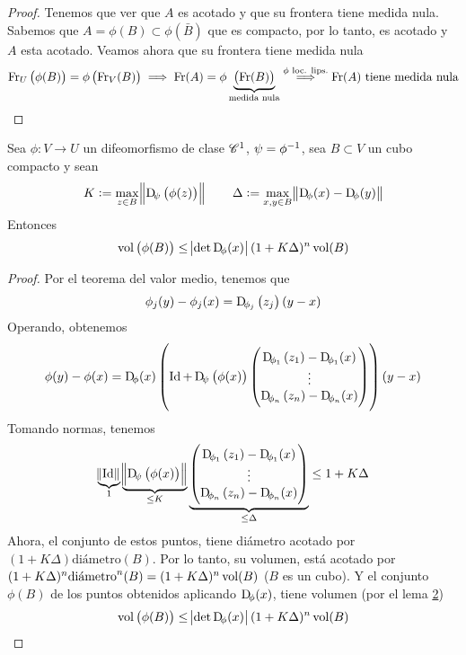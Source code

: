 \begin{proof}
    Tenemos que ver que $A$ es acotado y que su frontera tiene medida nula. Sabemos que $A = \phi(B) \subset \phi\left( \bar{B} \right)$ que es compacto,
    por lo tanto, es acotado y $A$ esta acotado. Veamos ahora que su frontera tiene medida nula
    \[
        \operatorname{Fr}_U\left( \phi(B) \right) = \phi\left( \operatorname{Fr}_V(B) \right) \implies \operatorname{Fr}(A) = \phi\underbrace{\left( \operatorname{Fr}(B) \right)}_{\text{medida nula}}
        \stackrel{\phi \text{ loc. lips.}}{\implies} \operatorname{Fr}(A) \text{ tiene medida nula}
    \]
\end{proof}

\begin{lema}[(6)]\label{lema:seis_cambio}
    Sea $\phi \colon V \to U$ un difeomorfismo de clase $\mathscr{C}^1$, $\psi = \phi^{-1}$, sea $B \subset V$ un cubo compacto y sean
    \[
        K := \max_{z \in B} \norm{\Dif_{\psi} \left( \phi(z) \right)} \qquad
        \Delta := \max_{x, y \in B} \norm{\Dif_\phi(x) - \Dif_\phi(y)}
    \]
    Entonces
    \[
        \vol\left( \phi(B) \right) \leq \abs{\det \Dif_\phi(x)}(1+K\Delta)^n \vol(B)
    \]
\end{lema}

\begin{proof}
    Por el teorema del valor medio, tenemos que
    \[
        \phi_j(y) - \phi_j(x) = \Dif_{\phi_j}\left( z_j \right)(y-x)
    \]
    Operando, obtenemos
    \[
        \phi(y) - \phi(x) = \Dif_\phi(x) \left( 
        \Id + \Dif_\psi\left( \phi(x) \right)
        \begin{pmatrix}
            \Dif_{\phi_1}\left( z_1 \right) - \Dif_{\phi_1} (x) \\
            \vdots \\
            \Dif_{\phi_n}\left( z_n \right) - \Dif_{\phi_n}(x)
        \end{pmatrix}
        \right)
        (y-x)
    \]
    Tomando normas, tenemos
    \[
        \underbrace{\norm{\Id}}_{1}
        \underbrace{\norm{\Dif_\psi\left( \phi(x) \right)}}_{\leq K}
        \underbrace{
            \begin{pmatrix}
                \Dif_{\phi_1}\left( z_1 \right) - \Dif_{\phi_1} (x)
                \\ \vdots \\
                \Dif_{\phi_n}\left( z_n \right) - \Dif_{\phi_n} (x)
            \end{pmatrix}
        }_{\leq \Delta} \leq 1 + K\Delta
    \]
    Ahora, el conjunto de estos puntos, tiene diámetro acotado por $(1+K\Delta)\text{diámetro}(B)$. Por lo tanto, su volumen,
    está acotado por $(1+K\Delta)^n\text{diámetro}^n(B) = (1+K\Delta)^n\operatorname{vol}(B)$ ($B$ es un cubo). Y el conjunto $\phi(B)$ de los puntos
    obtenidos aplicando $\Dif_\phi(x)$, tiene volumen (por el lema \hyperref[lema:dos_cambio]{2})
    \[
        \vol\left( \phi(B) \right) \leq \abs{\det \Dif_\phi(x)} (1+K\Delta)^n \vol(B)
    \]
\end{proof}

